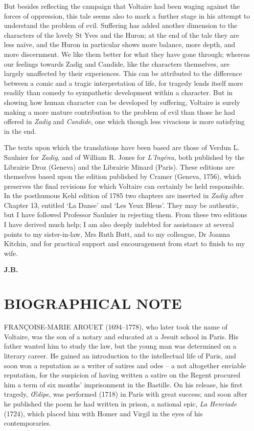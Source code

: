 \documentclass{article}
\begin{document}
\begin{center}
But besides reflecting the campaign that Voltaire had been waging against the forces 
of oppression, this tale seems also to mark a further stage in his attempt to understand 
the problem of evil. Suffering has added another dimension to the characters of 
the lovely St Yves and the Huron; at the end of the tale they are less naïve, 
and the Huron in particular shows more balance, more depth, and more discernment. 
We like them better for what they have gone through; whereas our feelings towards 
Zadig and Candide, like the characters themselves, are largely unaffected by their 
experiences. This can be attributed to the difference between a comic and a tragic 
interpretation of life, for tragedy lends itself more readily than comedy to sympathetic 
development within a character. But in showing how human character can be developed 
by suffering, Voltaire is surely making a more mature contribution to the problem 
of evil than those he had offered in \textit{Zadig} and \textit{Candide}, one which 
though less vivacious is more satisfying in the end. 

The texts upon which the translations have been based are those of Verdun L. Saulnier 
for \textit{Zadig}, and of William R. Jones for \textit{L'Ingénu}, both published 
by the Librairie Droz (Geneva) and the Librairie Minard (Paris). These editions 
are themselves based upon the edition published by Cramer (Geneva, 1756), which 
preserves the final revisions for which Voltaire can certainly be held responsible. 
In the posthumous Kehl edition of 1785 two chapters are inserted in \textit{Zadig} 
after Chapter 13, entitled `La Danse' and `Les Yeux Bleus'. They may be authentic, 
but I have followed Professor Saulnier in rejecting them. From these two editions 
I have derived much help; I am also deeply indebted for assistance at several points 
to my sister-in-law, Mrs Ruth Butt, and to my colleague, Dr Joanna Kitchin, and 
for practical support and encouragement from start to finish to my wife.

\begin{flushright}
\textbf{J.B.\pagebreak{} }
\end{flushright}

\section*{\textbf{BIOGRAPHICAL NOTE }}

\baselineskip=12pt
\leftskip=0pt
FRANÇOISE-MARIE AROUET (1694–1778), who later took the name of Voltaire, was 
the son of a notary and educated at a Jesuit school in Paris. His father wanted 
him to study the law, but the young man was determined on a literary career. He 
gained an introduction to the intellectual life of Paris, and soon won a reputation 
as a writer of satires and odes – a not altogether enviable reputation, for the 
suspicion of having written a satire on the Regent procured him a term of six months' 
imprisonment in the Bastille. On his release, his first tragedy, \textit{Œdipe}, 
was performed (1718) in Paris with great success; and soon after he published the 
poem he had written in prison, a national epic, \textit{La Henriade} (1724), which 
placed him with Homer and Virgil in the eyes of his contemporaries. 


\end{center}
\end{document}
